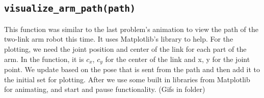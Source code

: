 \documentclass{article}
\begin{document}
\subsection{\texttt{visualize\_arm\_path(path)}}

This function was similar to the last problem's animation to view the path of the two-link arm robot this time. It uses Matplotlib's library to help. For the plotting, we need the joint position and center of the link for each part of the arm. In the function, it is $c_{x}$, $c_{y}$ for the center of the link and x, y for the joint point. We update based on the pose that is sent from the path and then add it to the initial set for plotting. After we use some built in libraries from Matplotlib for animating, and start and pause functionality. (Gifs in folder)
\end{document}
